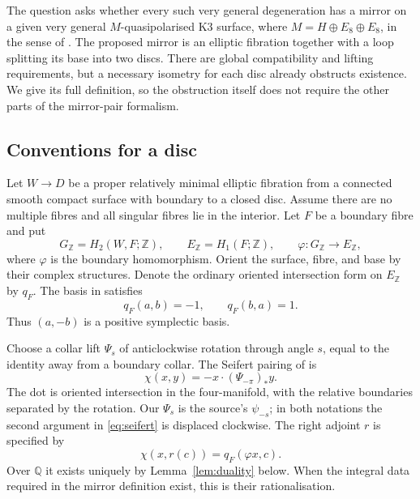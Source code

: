\documentclass[11pt]{article}
\theoremstyle{definition}
\theoremstyle{remark}
\newcommand{\Z}{\mathbb Z}
\newcommand{\Q}{\mathbb Q}
\begin{document}
The question asks whether every such very general degeneration has a mirror on a given very general $M$-quasipolarised K3 surface, where $M=H\oplus E_8\oplus E_8$, in the sense of \cite[Definitions~4.11, 4.21, and~5.1]{GT}. The proposed mirror is an elliptic fibration together with a loop splitting its base into two discs. There are global compatibility and lifting requirements, but a necessary isometry for each disc already obstructs existence. We give its full definition, so the obstruction itself does not require the other parts of the mirror-pair formalism.

\subsection{Conventions for a disc}
Let $W\to D$ be a proper relatively minimal elliptic fibration from a connected smooth compact surface with boundary to a closed disc. Assume there are no multiple fibres and all singular fibres lie in the interior. Let $F$ be a boundary fibre and put
\[
G_{\Z}=H_2(W,F;\Z),\qquad E_{\Z}=H_1(F;\Z),\qquad
\varphi:G_{\Z}\longrightarrow E_{\Z},
\]
where $\varphi$ is the boundary homomorphism. Orient the surface, fibre, and base by their complex structures. Denote the ordinary oriented intersection form on $E_{\Z}$ by $q_F$. The basis in \cite[Definition~2.2]{GT} satisfies
\begin{equation}\label{eq:fibre}
q_F(a,b)=-1,\qquad q_F(b,a)=1.
\end{equation}
Thus $(a,-b)$ is a positive symplectic basis.


Choose a collar lift $\Psi_s$ of anticlockwise rotation through angle $s$, equal to the identity away from a boundary collar. The Seifert pairing of \cite[Definition~4.1]{GT} is
\begin{equation}\label{eq:seifert}
\chi(x,y)=-x\mathbin{\cdot}(\Psi_{-\pi})_*y.
\end{equation}
The dot is oriented intersection in the four-manifold, with the relative boundaries separated by the rotation. Our $\Psi_s$ is the source's $\psi_{-s}$; in both notations the second argument in \eqref{eq:seifert} is displaced clockwise. The right adjoint $r$ is specified by
\begin{equation}\label{eq:adjoint}
\chi(x,r(c))=q_F(\varphi x,c).
\end{equation}
Over $\Q$ it exists uniquely by Lemma~\ref{lem:duality} below. When the integral data required in the mirror definition exist, this is their rationalisation.
\end{document}
